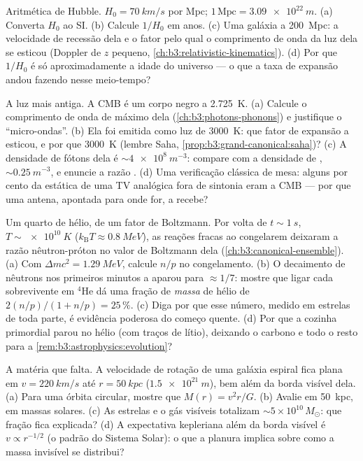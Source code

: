 \begin{exercise}[$\star\star\star$]\label{exo:b3:astrophysics:9}
Aritmética de Hubble. $H_0 = \qty{70}{km/s}$ por Mpc; $1\,
\text{Mpc} = \qty{3.09e22}{m}$. (a) Converta $H_0$ ao SI. (b)
Calcule $1/H_0$ em anos. (c) Uma galáxia a \qty{200}{Mpc}: a
velocidade de recessão dela e o fator pelo qual o comprimento de onda da
luz dela se esticou (Doppler de $z$ pequeno,
\cref{ch:b3:relativistic-kinematics}). (d) Por que $1/H_0$ é só
aproximadamente a idade do universo --- o que a taxa de expansão
andou fazendo nesse meio-tempo?
\end{exercise}

\begin{exercise}[$\star\star\star$]\label{exo:b3:astrophysics:10}
A luz mais antiga. A CMB é um corpo negro a \qty{2.725}{K}. (a)
Calcule o comprimento de onda de máximo dela (\cref{ch:b3:photons-phonons}) e
justifique o ``micro-ondas''. (b) Ela foi emitida como
luz de \qty{3000}{K}: que fator de expansão a esticou,
e por que \qty{3000}{K} (lembre Saha,
\cref{prop:b3:grand-canonical:saha})? (c) A densidade de fótons dela é
$\sim\qty{4e8}{m^{-3}}$: compare com a densidade de ,
$\sim\qty{0.25}{m^{-3}}$, e enuncie a razão .
(d) Uma verificação clássica de mesa: alguns por cento da estática de uma
TV analógica fora de sintonia eram a CMB --- por que uma antena, apontada
para onde for, a recebe?
\end{exercise}

\begin{exercise}[$\star\star\star$]\label{exo:b3:astrophysics:11}
Um quarto de hélio, de um fator de Boltzmann. Por volta de $t \sim
\qty{1}{s}$, $T \sim \qty{e10}{K}$ ($k_{\text{B}}T \approx
\qty{0.8}{MeV}$), as reações fracas ao congelarem deixaram a
razão nêutron-próton no valor de Boltzmann dela
(\cref{ch:b3:canonical-ensemble}). (a) Com $\Delta mc^2 =
\qty{1.29}{MeV}$, calcule $n/p$ no congelamento. (b) O decaimento de
nêutrons nos primeiros minutos a aparou para $\approx1/7$: mostre que
ligar cada sobrevivente em $^4$He dá uma fração de \emph{massa} de hélio
de $2(n/p)/(1 + n/p) = 25\,\%$. (c) Diga por que esse número,
medido em estrelas de toda parte, é evidência poderosa do começo
quente. (d) Por que a cozinha primordial parou no hélio
(com traços de lítio), deixando o carbono e todo o resto para a
\cref{rem:b3:astrophysics:evolution}?
\end{exercise}

\begin{exercise}[$\star\star\star$]\label{exo:b3:astrophysics:12}
A matéria que falta. A velocidade de rotação de uma galáxia espiral fica
plana em $v = \qty{220}{km/s}$ até $r = \qty{50}{kpc}$
($\qty{1.5e21}{m}$), bem além da borda visível dela. (a) Para uma
órbita circular, mostre que $M(r) = v^2r/G$. (b) Avalie em
\qty{50}{kpc}, em massas solares. (c) As estrelas e o gás visíveis
totalizam $\sim5\times10^{10}\,M_\odot$: que fração fica
explicada? (d) A expectativa kepleriana além da borda visível
é $v \propto r^{-1/2}$ (o padrão do Sistema Solar): o que a
planura implica sobre como a massa invisível se distribui?
\end{exercise}

